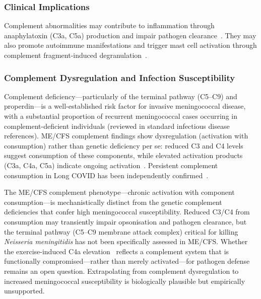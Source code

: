 \subsubsection{Clinical Implications}

Complement abnormalities may contribute to inflammation through anaphylatoxin (C3a, C5a) production and impair pathogen clearance~\cite{EatonFitch2019}. They may also promote autoimmune manifestations and trigger mast cell activation through complement fragment-induced degranulation~\cite{EatonFitch2019}.

\subsubsection{Complement Dysregulation and Infection Susceptibility}
\label{sec:complement-infection}

Complement deficiency---particularly of the terminal pathway (C5--C9) and properdin---is a well-established risk factor for invasive meningococcal disease, with a substantial proportion of recurrent meningococcal cases occurring in complement-deficient individuals (reviewed in standard infectious disease references). ME/CFS complement findings show dysregulation (activation with consumption) rather than genetic deficiency per se: reduced C3 and C4 levels suggest consumption of these components, while elevated activation products (C3a, C4a, C5a) indicate ongoing activation~\cite{EatonFitch2019}. Persistent complement consumption in Long COVID has been independently confirmed~\cite{Klein2024longcovid}.

\begin{limitation}
The ME/CFS complement phenotype---chronic activation with component consumption---is mechanistically distinct from the genetic complement deficiencies that confer high meningococcal susceptibility. Reduced C3/C4 from consumption may transiently impair opsonisation and pathogen clearance, but the terminal pathway (C5--C9 membrane attack complex) critical for killing \textit{Neisseria meningitidis} has not been specifically assessed in ME/CFS. Whether the exercise-induced C4a elevation~\cite{Sorensen2003complement,Glass2025ev} reflects a complement system that is functionally compromised---rather than merely activated---for pathogen defense remains an open question. Extrapolating from complement dysregulation to increased meningococcal susceptibility is biologically plausible but empirically unsupported.
\end{limitation}

